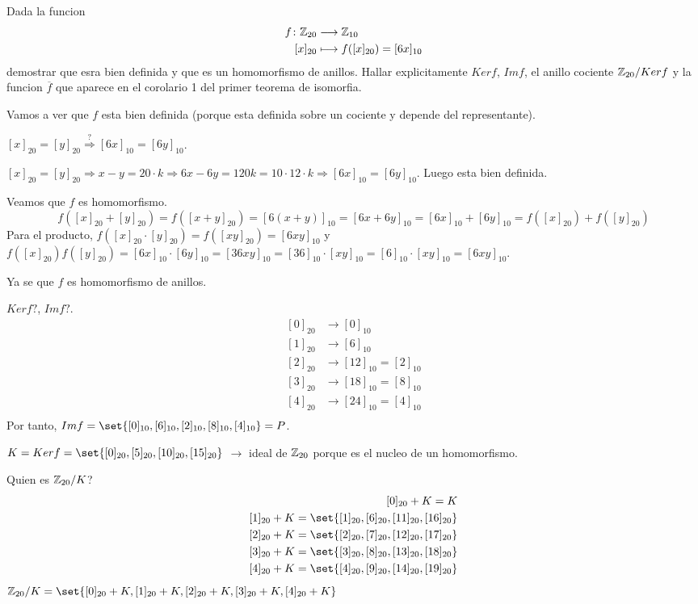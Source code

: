 \begin{example}
	Dada la funcion
	\[
		\begin{aligned}
			f \colon \mathbb{Z}_{20 } & \longrightarrow \mathbb{Z}_{10 }              \\
			[x]_{20}          & \longmapsto f ([x]_{20}) = [6x]_{10}
		\end{aligned}
	\]
	demostrar que esra bien definida y que es un homomorfismo de anillos. Hallar explicitamente \(Kerf \), \(Imf \), el anillo cociente \(\mathbb{Z}_{20}/Kerf \) y la funcion \(\overline{f }\) que aparece en el corolario 1 del primer teorema de isomorfia.
	
	Vamos a ver que \( f \) esta bien definida (porque esta definida sobre un cociente y depende del representante).
	
	\([x]_{20} = [y]_{20} \overset{?}{\Rightarrow} [6x]_{10} = [6y]_{10}\).
	
	\([x]_{20} = [y]_{20} \Rightarrow x - y = 20 \cdot k \Rightarrow 6x - 6y = 120k = 10 \cdot 12 \cdot k \Rightarrow [6x]_{10} = [6y]_{10}\). Luego esta bien definida.
	
	Veamos que \(f \) es homomorfismo.
	\[
		f([x]_{20} + [y]_{20}) = f([x+y]_{20}) = [6(x+y)]_{10} = [6x + 6y]_{10} = [6x]_{10} + [6y]_{10} = f([x]_20) + f([y]_{20})
	\]
	Para el producto, \(f([x]_{20} \cdot [y]_{20}) = f([xy]_20) = [6xy]_{10}\) y \(f([x]_{20}) f([y]_20) = [6x]_{10} \cdot [6y]_{10} = [36xy]_{10} = [36]_{10} \cdot [xy]_{10} = [6]_{10} \cdot [xy]_10 = [6xy]_{10}\).
	
	Ya se que \(f \) es homomorfismo de anillos.
	
	\(Kerf? \), \(Imf? \).
	\[
		\begin{aligned}
			[0]_{20} & \to [0]_{10}             \\
			[1]_{20} & \to [6]_{10}             \\
			[2]_{20} & \to [12]_{10} = [2]_{10} \\
			[3]_{20} & \to [18]_{10} = [8]_{10} \\
			[4]_{20} & \to [24]_{10} = [4]_{10} \\
		\end{aligned}
	\]
	Por tanto, \(Imf = \set{[0]_{10}, [6]_{10}, [2]_{10}, [8]_{10}, [4]_{10}} = P \).
	
	\(K = Kerf = \set{[0]_{20}, [5]_{20}, [10]_{20},[15]_{20}}\) \(\rightarrow \) ideal de \(\mathbb{Z}_{20 }\) porque es el nucleo de un homomorfismo.
	
	Quien es \(\mathbb{Z}_{20}/K \)?
	\[
		\begin{aligned}
			[0]_{20} + K = K                                              \\
			[1]_{20} + K = \set{[1]_{20}, [6]_{20}, [11]_{20}, [16]_{20}} \\
			[2]_{20} + K= \set{[2]_{20}, [7]_{20}, [12]_{20}, [17]_{20}}  \\
			[3]_{20} + K= \set{[3]_{20}, [8]_{20}, [13]_{20}, [18]_{20}}  \\
			[4]_{20} + K= \set{[4]_{20}, [9]_{20}, [14]_{20}, [19]_{20}}  \\
		\end{aligned}
	\]
	\(\Z_{20}/K = \set{[0]_{20} + K,[1]_{20} + K,[2]_{20} + K,[3]_{20} + K, [4]_{20} + K}\)
	

\end{example}
